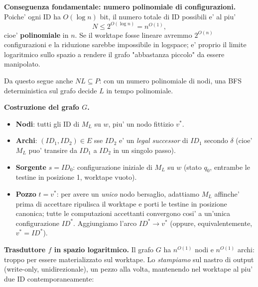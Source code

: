 {  \textbf{Conseguenza fondamentale: numero polinomiale di configurazioni.} Poiche' ogni ID ha $O(\log n)$ bit, il numero totale di ID possibili e' al piu'
  \[
    N \leq 2^{O(\log n)} = n^{O(1)},
  \]
  cioe' \textbf{polinomiale} in $n$. Se il worktape fosse lineare avremmo $2^{O(n)}$ configurazioni e la riduzione sarebbe impossibile in logspace; e' proprio il limite logaritmico sullo spazio a rendere il grafo "abbastanza piccolo" da essere manipolato.

  Da questo segue anche $NL \subseteq P$: con un numero polinomiale di nodi, una BFS deterministica sul grafo decide $L$ in tempo polinomiale.

  \textbf{Costruzione del grafo $G$.}
  \begin{itemize}
    \item \textbf{Nodi}: tutti gli ID di $M_L$ su $w$, piu' un nodo fittizio $v^*$.
    \item \textbf{Archi}: $(\mathit{ID}_1, \mathit{ID}_2) \in E$ sse $\mathit{ID}_2$ e' un \emph{legal successor} di $\mathit{ID}_1$ secondo $\delta$ (cioe' $M_L$ puo' transire da $\mathit{ID}_1$ a $\mathit{ID}_2$ in un singolo passo).
    \item \textbf{Sorgente} $s = \mathit{ID}_0$: configurazione iniziale di $M_L$ su $w$ (stato $q_0$, entrambe le testine in posizione 1, worktape vuoto).
    \item \textbf{Pozzo} $t = v^*$: per avere un \emph{unico} nodo bersaglio, adattiamo $M_L$ affinche' prima di accettare ripulisca il worktape e porti le testine in posizione canonica; tutte le computazioni accettanti convergono cosi' a un'unica configurazione $\mathit{ID}^*$. Aggiungiamo l'arco $\mathit{ID}^* \to v^*$ (oppure, equivalentemente, $v^* = \mathit{ID}^*$).
  \end{itemize}

  \textbf{Trasduttore $f$ in spazio logaritmico.} Il grafo $G$ ha $n^{O(1)}$ nodi e $n^{O(1)}$ archi: troppo per essere materializzato sul worktape. Lo \emph{stampiamo} sul nastro di output (write-only, unidirezionale), un pezzo alla volta, mantenendo nel worktape al piu' due ID contemporaneamente:

}
